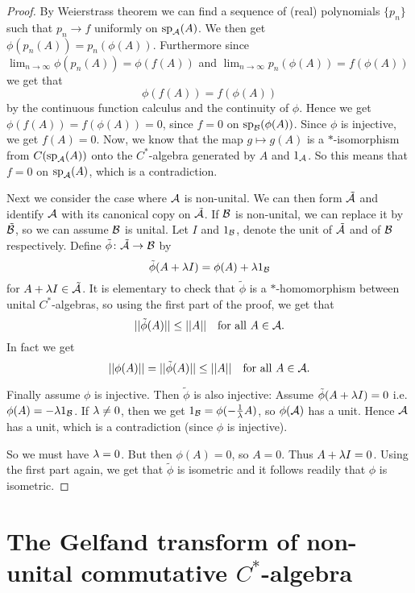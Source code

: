\documentclass[10pt,english,a4paper]{article}
\theoremstyle{definition}
\DeclareMathOperator{\Sp}{sp}
\begin{document}
\begin{proof}
By Weierstrass theorem we can find a sequence of (real) polynomials $\{p_n\}$
such that $p_n \to f$ uniformly on $\Sp_{\As}(A)$. We then get $\phi(p_n(A)) = p_n(\phi(A))$. Furthermore 
since $\lim_{n\to\infty} \phi(p_n(A)) = \phi(f(A))$ and $\lim_{n \to \infty}
p_n(\phi(A)) = f(\phi(A))$ we get that \[\phi(f(A)) = f(\phi(A))\] by the
continuous function calculus and the continuity of $\phi$.
Hence we get $\phi(f(A)) = f(\phi(A)) = 0$, since $f = 0$ on $\Sp_{\Bs}(\phi(A))$. 
Since $\phi$ is injective, we get $f(A) = 0$. Now, we know that the map $g \mapsto g(A)$
is a $*$-isomorphism from $C(\Sp_{\As}(A))$ onto the $C^*$-algebra generated 
by $A$ and $1_{\mathcal{A}}$. So this means that $f=0$ on $\Sp_{\As}(A)$, which is a contradiction. 

Next we consider the case where $\mathcal{A}$ is non-unital. 
We can then form $\tilde{\mathcal{A}}$ and identify $\mathcal{A}$ with its canonical copy on $\tilde{\mathcal{A}}$.
If $\mathcal{B}$ is non-unital, we can replace it by $\tilde{\mathcal{B}}$, so we can assume $\mathcal{B}$ is 
unital. Let $I$ and $1_{\mathcal{B}}$, denote the unit of $\tilde{\mathcal{A}}$ and of $\mathcal{B}$ 
respectively. Define $\tilde{\phi}\colon \tilde{\mathcal{A}} \to \mathcal{B}$ by 
\[ \tilde{\phi}(A + \lambda I) = \phi(A) + \lambda 1_{\mathcal{B}} \]
for $A + \lambda I \in \tilde{\mathcal{A}}$. It is elementary to check that 
$\tilde{\phi}$ is a $*$-homomorphism between unital $C^*$-algebras, so using 
the first part of the proof, we get that 
\[ ||\tilde{\phi}(A) || \leq ||A|| \quad \text{for all } A \in \mathcal{A}.\]
In fact we get 
\[ ||\phi(A)|| = ||\tilde{\phi}(A)|| \leq||A|| \quad \text{for all }A \in \mathcal{A}. \]

Finally assume $\phi$ is injective. Then $\tilde{\phi}$ is also injective:
Assume $\tilde{\phi}(A + \lambda I) = 0$ i.e. $\phi(A) = - \lambda 1_{\mathcal{B}}$.
If $\lambda \neq 0$, then we get $1_{\mathcal{B}} = \phi(-\tfrac{1}{\lambda}A)$, so $\phi(\mathcal{A})$
has a unit. Hence $\mathcal{A}$ has a unit, which is a contradiction (since $\phi$ is injective).

So we must have $\lambda =0$. But then $\phi(A) = 0$, so $A = 0$. Thus $A+ \lambda I = 0$. 
Using the first part again, we get that $\tilde{\phi}$ is isometric and it follows readily 
that $\phi$ is isometric. 


\end{proof}

\section{The Gelfand transform of non-unital commutative $C^*$-algebra}
\end{document}

